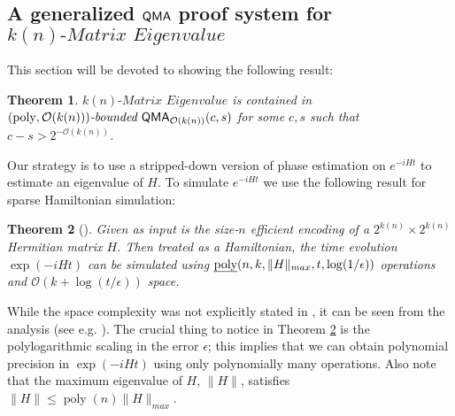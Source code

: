 \documentclass[11pt]{article}
\newtheorem{theorem}{Theorem}
\newtheorem{remark}[theorem]{Remark}
\theoremstyle{definition}
\theoremstyle{remark}
\newcommand\QMA{{\sf{QMA}}}
\newcommand\bddQMA[5]{{\left(#1,#2\right)}\textit{-bounded }\QMA_{#3}(#4,#5)}
\newcommand\spechamiltonian[1]{#1\textit{-Matrix Eigenvalue}}
\newcommand\bigoh{\mathcal{O}}
\DeclareMathOperator{\poly}{poly}
\begin{document}
\subsection{A generalized $\QMA$ proof system for $\spechamiltonian{k(n)}$}\label{subsec:specham-in-bddqma}
This section will be devoted to showing the following result:
\begin{theorem} \label{lem:qma protocol}
$\spechamiltonian{k(n)}$ is contained in $\bddQMA{\poly}{\bigoh(k(n))}{\bigoh(k(n))}{c}{s}$ for some $c,s$ such that $c - s > 2^{-\mathcal{O}(k(n))}$.
\end{theorem}
Our strategy is to use a stripped-down version of phase estimation on $e^{-iHt}$ to estimate an eigenvalue of $H$. To simulate $e^{-iHt}$ we use the following result for sparse Hamiltonian simulation:
\begin{theorem}[\cite{berry14,bccks15,berry15}] \label{thm:ham_sim}
Given as input is the size-$n$ efficient encoding of a $2^{k(n)} \times 2^{k(n)}$ Hermitian matrix $H$. Then treated as a Hamiltonian, the time evolution $\exp(-iHt)$ can be simulated using $\text{\emph{poly}}(n,k,\|H\|_{max}, t, \log(1/\epsilon))$ operations and $\bigoh(k+\log(t/\epsilon))$ space.
\end{theorem}
While the space complexity was not explicitly stated in \cite{berry14,bccks15,berry15}, it can be seen from the analysis (see e.g. \cite{bccks15}). The crucial thing to notice in Theorem \ref{thm:ham_sim} is the polylogarithmic scaling in the error $\epsilon$; this implies that we can obtain polynomial precision in $\exp(-iHt)$ using only polynomially many operations. Also note that the maximum eigenvalue of $H$, $\|H\|$, satisfies $\|H\| \le \poly(n) \|H\|_{max}$.
\end{document}
